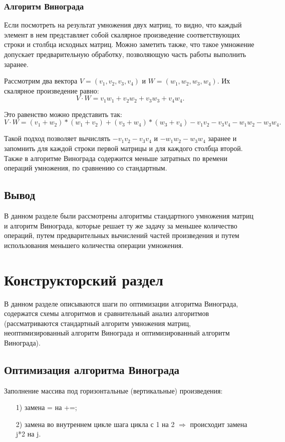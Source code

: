 \documentclass[a4paper,12pt]{article}
\begin{document}
		    
	  	\subsubsection{Алгоритм Винограда}
		Если посмотреть на результат умножения двух матриц, то видно,
что каждый элемент в нем представляет собой скалярное произведение
соответствующих строки и столбца исходных матриц. Можно заметить
также, что такое умножение допускает предварительную обработку,
позволяющую часть работы выполнить заранее.
	
	Рассмотрим два вектора $V = (v_1, v_2, v_3, v_4)$ и $W = (w_1, w_2, w_3, w_4)$. Их скалярное произведение равно:
	\[
	 V \cdot W = v_1w_1 + v_2w_2 + v_3w_3 + v_4w_4.
	\]
	
	Это равенство можно представить так:
	\[
	 V \cdot W = (v_1 + w_2) * (w_1 + v_2) + (v_3 + w_4)*(w_3 + v_4) - v_1v_2 - v_3v_4 - w_1w_2 - w_3w_4.
	 \]	 
	 
	Такой подход позволяет вычислять $ - v_1v_2 - v_3v_4$ и $ - w_1w_2 - w_3w_4$ заранее и запомнить для каждой строки первой матрицы и для каждого столбца второй. Также в алгоритме Винограда содержится меньше затратных по времени операций умножения, по сравнению со стандартным\cite{makkonell}.
	

	    
		\subsection*{Вывод}
		В данном разделе были рассмотрены алгоритмы стандартного умножения матриц и алгоритм Винограда, которые решает ту же задачу за меньшее количество операций, путем предварительных вычислений частей произведения и путем использования меньшего количества операции умножения. 


\pagebreak


\section{Конструкторский раздел}
	В данном разделе описываются шаги по оптимизации алгоритма Винограда, содержатся схемы алгоритмов и сравнительный анализ алгоритмов (рассматриваются стандартный алгоритм умножения матриц, неоптимизированный алгоритм Винограда и оптимизированный алгоритм Винограда).
	
    \subsection{Оптимизация алгоритма Винограда}
		Заполнение массива под горизонтальные (вертикальные) произведения:
	\begin{enumerate} 
	\item[1)] замена = на +=;
	\item[2)] замена во внутреннем цикле шага цикла с 1 на 2 $\Rightarrow$ происходит замена j*2 на j.
	\end{enumerate}
	
\end{document}
